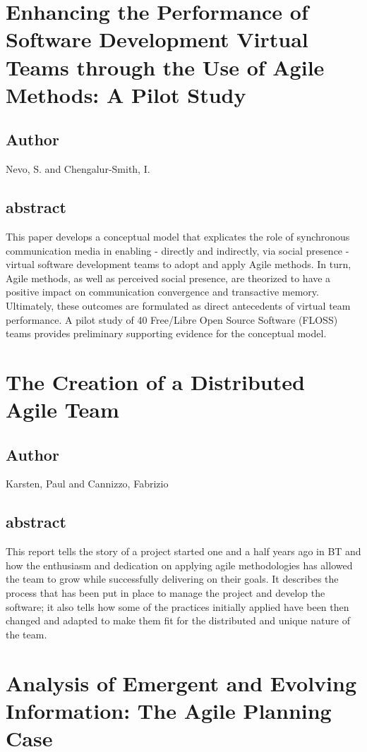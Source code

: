 \documentclass[lnbip,sechang,a4paper]{svmultln}
\begin{document}
\section{Enhancing the Performance of Software Development Virtual Teams through
the Use of Agile Methods: A Pilot Study}
\subsection{Author}
Nevo, S. and Chengalur-Smith, I.
\subsection{abstract}
This paper develops a conceptual model that explicates the role of synchronous
communication media in enabling - directly and indirectly, via social presence -
virtual software development teams to adopt and apply Agile methods. In turn, Agile methods, as well as perceived social presence, are theorized to have a positive impact on communication convergence and transactive memory. Ultimately, these outcomes are formulated as direct antecedents of virtual team performance. A pilot study of 40 Free/Libre Open Source Software (FLOSS) teams provides preliminary supporting evidence for the conceptual model.
\cite{5718463}
\section{The Creation of a Distributed Agile Team}
\subsection{Author}
Karsten, Paul and Cannizzo, Fabrizio
\subsection{abstract}
This report tells the story of a project started one and a half years ago in BT
and how the enthusiasm and dedication on applying agile methodologies has
allowed the team to grow while successfully delivering on their goals. It describes the process that has been put in place to manage the project and develop the software; it also tells how some of the practices initially applied have been then changed and adapted to make them fit for the distributed and unique nature of the team.
\cite{springerlink:10.1007/978-3-540-73101-6_44}
\section{Analysis of Emergent and Evolving Information: The Agile Planning Case}
\end{document}
